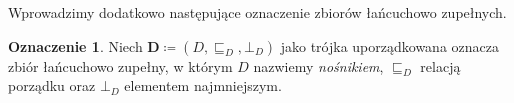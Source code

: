 \documentclass[11pt,a4paper]{article}
\theoremstyle{definition}
\newtheorem{definicja}{Definicja}[section]
\newtheorem{oznaczenie}[definicja]{Oznaczenie}
\theoremstyle{plain}
\newcommand{\bt}{\bot}                            %
\begin{document}
Wprowadzimy dodatkowo następujące oznaczenie zbiorów łańcuchowo zupełnych.

\begin{oznaczenie}
	Niech $\boldsymbol{D} \coloneqq (D, \sqsubseteq_D, \bt_D)$ jako trójka uporządkowana oznacza zbiór łańcuchowo zupełny, w którym $D$ nazwiemy \emph{nośnikiem}, $\sqsubseteq_D$ relacją porządku oraz $\bt_D$ elementem najmniejszym.
\end{oznaczenie}

\end{document}
